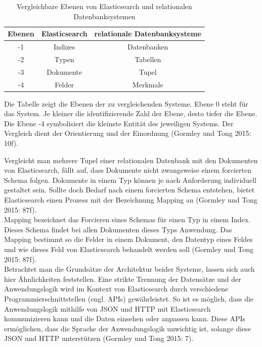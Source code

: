 \documentclass[a4paper]{scrartcl}
\begin{document}
\begin{table}[htb]
	\centering
	\caption{Vergleichbare Ebenen von Elasticsearch und relationalen Datenbanksystemen}
	\begin{center}
		
		\begin{tabular}{|c||c | c|}
			\hline
			Ebenen & Elasticsearch & relationale Datenbanksysteme \\ [0.5ex]
			\hline \hline
			-1 & Indizes & Datenbanken \\
			\hline
			-2 & Typen & Tabellen \\
			\hline
			-3 & Dokumente & Tupel \\
			\hline
			-4 & Felder & Merkmale \\
			\hline
		\end{tabular}
	\end{center}
	Die Tabelle zeigt die Ebenen der zu vergleichenden Systeme. Ebene 0 steht für das System. Je kleiner die identifizierende Zahl der Ebene, desto tiefer die Ebene. Die Ebene -4 symbolisiert die kleinste Entität des jeweiligen Systems. Der Vergleich dient der Orientierung und der Einordnung (Gormley und Tong 2015: 10f).
\end{table}

Vergleicht man mehrere Tupel einer relationalen Datenbank mit den Dokumenten von Elasticsearch, fällt auf, dass Dokumente nicht zwangsweise einem forcierten Schema folgen. Dokumente in einem Typ können je nach Anforderung individuell gestaltet sein. Sollte doch Bedarf nach einem forcierten Schema entstehen, bietet Elasticsearch einen Prozess mit der Bezeichnung Mapping an (Gormley und Tong 2015: 87f). \\
Mapping bezeichnet das Forcieren eines Schemas für einen Typ in einem Index. Dieses Schema findet bei allen Dokumenten dieses Typs Anwendung. Das Mapping bestimmt so die Felder in einem Dokument, den Datentyp eines Feldes und wie dieses Feld von Elasticsearch behandelt werden soll (Gormley und Tong 2015: 87f). \\

Betrachtet man die Grundsätze der Architektur beider Systeme, lassen sich auch hier Ähnlichkeiten feststellen. Eine strikte Trennung der Datensätze und der Anwendungslogik wird im Kontext von Elasticsearch durch verschiedene Programmierschnittstellen (engl. APIs) gewährleistet. So ist es möglich, dass die Anwendungslogik mithilfe von JSON und HTTP mit Elasticsearch kommunizieren kann und die Daten einsehen oder anpassen kann. Diese APIs ermöglichen, dass die Sprache der Anwendungslogik unwichtig ist, solange diese JSON und HTTP unterstützen (Gormley und Tong 2015: 7). \\
\end{document}
